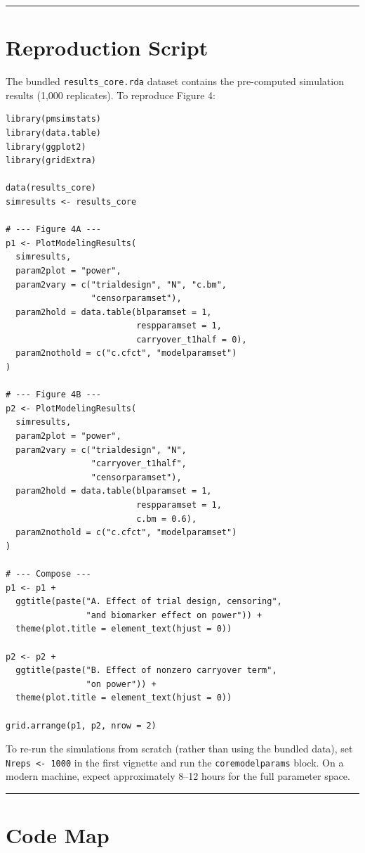 \documentclass[11pt]{article}
\begin{document}
\bigskip\noindent\rule{\textwidth}{0.4pt}\bigskip

\section{Reproduction Script}

The bundled \texttt{results\_core.rda} dataset contains the pre-computed
simulation results (1,000 replicates). To reproduce Figure 4:

\begin{lstlisting}
library(pmsimstats)
library(data.table)
library(ggplot2)
library(gridExtra)

data(results_core)
simresults <- results_core

# --- Figure 4A ---
p1 <- PlotModelingResults(
  simresults,
  param2plot = "power",
  param2vary = c("trialdesign", "N", "c.bm",
                 "censorparamset"),
  param2hold = data.table(blparamset = 1,
                          respparamset = 1,
                          carryover_t1half = 0),
  param2nothold = c("c.cfct", "modelparamset")
)

# --- Figure 4B ---
p2 <- PlotModelingResults(
  simresults,
  param2plot = "power",
  param2vary = c("trialdesign", "N",
                 "carryover_t1half",
                 "censorparamset"),
  param2hold = data.table(blparamset = 1,
                          respparamset = 1,
                          c.bm = 0.6),
  param2nothold = c("c.cfct", "modelparamset")
)

# --- Compose ---
p1 <- p1 +
  ggtitle(paste("A. Effect of trial design, censoring",
                "and biomarker effect on power")) +
  theme(plot.title = element_text(hjust = 0))

p2 <- p2 +
  ggtitle(paste("B. Effect of nonzero carryover term",
                "on power")) +
  theme(plot.title = element_text(hjust = 0))

grid.arrange(p1, p2, nrow = 2)
\end{lstlisting}

To re-run the simulations from scratch (rather than using the
bundled data), set \texttt{Nreps <- 1000} in the first vignette and
run the \texttt{coremodelparams} block. On a modern machine, expect
approximately 8--12 hours for the full parameter space.

\bigskip\noindent\rule{\textwidth}{0.4pt}\bigskip

\section{Code Map}
\end{document}
